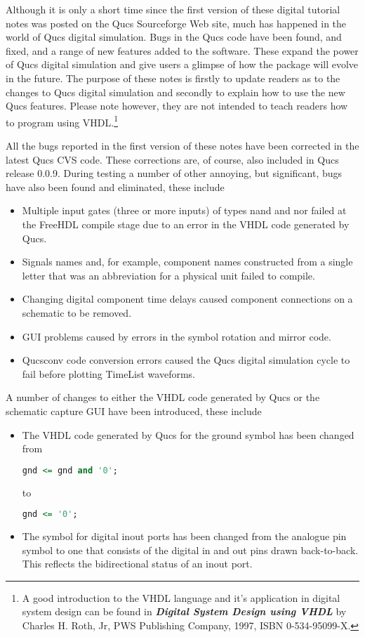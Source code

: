Although it is only a short time since the first version of these
digital tutorial notes was posted on the Qucs Sourceforge Web site,
much has happened in the world of Qucs digital simulation.  Bugs in
the Qucs code have been found, and fixed, and a range of new features
added to the software. These expand the power of Qucs digital
simulation and give users a glimpse of how the package will evolve in
the future.  The purpose of these notes is firstly to update readers
as to the changes to Qucs digital simulation and secondly to explain
how to use the new Qucs features.  Please note however, they are not
intended to teach readers how to program using VHDL.\footnote{A good
introduction to the VHDL language and it's application in digital
system design can be found in \textbf{\textit{Digital System Design
using VHDL}} by Charles H. Roth, Jr, PWS Publishing Company, 1997,
ISBN 0-534-95099-X. }


All the bugs reported in the first version of these notes have been
corrected in the latest Qucs CVS code.  These corrections are, of
course, also included in Qucs release 0.0.9. During testing a number
of other annoying, but significant, bugs have also been found and
eliminated, these include

\begin{itemize}
\item
Multiple input gates (three or more inputs) of types nand and nor
failed at the FreeHDL compile stage due to an error in the VHDL code
generated by Qucs.
\item
Signals names and, for example, component names constructed from a
single letter that was an abbreviation for a physical unit failed to
compile.
\item
Changing digital component time delays caused component connections on
a sche\-ma\-tic to be removed.
\item
GUI problems caused by errors in the symbol rotation and mirror code.
\item
Qucsconv code conversion errors caused the Qucs digital simulation
cycle to fail before plotting TimeList waveforms.
\end{itemize}

A number of changes to either the VHDL code generated by Qucs or the
schematic capture GUI have been introduced, these include

\begin{itemize}
\item The VHDL code generated by Qucs for the ground symbol has been changed from
\begin{lstlisting}[language=VHDL]
gnd <= gnd and '0';
\end{lstlisting}
to
\begin{lstlisting}[language=VHDL]
gnd <= '0';
\end{lstlisting}
\item The symbol for digital inout ports has been changed from the analogue pin symbol to one that consists of the digital in and out pins drawn back-to-back.  This reflects the bidirectional status of an inout port.
\end{itemize}

